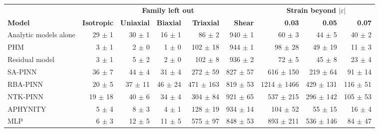 \begin{tabular}{lrrrrrrrr}
\toprule
 & \multicolumn{5}{c}{\textbf{Family left out}} & \multicolumn{3}{c}{\textbf{Strain beyond $|\varepsilon|$}} \\
\cmidrule(lr){2-6}\cmidrule(l){7-9}
\textbf{Model} & \textbf{Isotropic} & \textbf{Uniaxial} & \textbf{Biaxial} & \textbf{Triaxial} & \textbf{Shear} & \textbf{0.03} & \textbf{0.05} & \textbf{0.07} \\
\midrule
Analytic models alone & 29 $\pm$ 1 & 30 $\pm$ 1 & 16 $\pm$ 1 & 86 $\pm$ 2 & 940 $\pm$ 1 & 60 $\pm$ 3 & 44 $\pm$ 5 & 40 $\pm$ 2 \\
PHM & 3 $\pm$ 1 & 2 $\pm$ 0 & 1 $\pm$ 0 & 102 $\pm$ 18 & 944 $\pm$ 1 & 98 $\pm$ 28 & 49 $\pm$ 19 & 11 $\pm$ 3 \\
Residual model & 3 $\pm$ 1 & 5 $\pm$ 2 & 2 $\pm$ 0 & 102 $\pm$ 8 & 936 $\pm$ 2 & 72 $\pm$ 5 & 45 $\pm$ 8 & 23 $\pm$ 4 \\
SA-PINN & 36 $\pm$ 7 & 44 $\pm$ 4 & 31 $\pm$ 4 & 272 $\pm$ 59 & 827 $\pm$ 57 & 616 $\pm$ 150 & 219 $\pm$ 64 & 91 $\pm$ 14 \\
RBA-PINN & 20 $\pm$ 5 & 37 $\pm$ 11 & 46 $\pm$ 24 & 471 $\pm$ 163 & 819 $\pm$ 53 & 1214 $\pm$ 1466 & 429 $\pm$ 131 & 116 $\pm$ 51 \\
NTK-PINN & 19 $\pm$ 18 & 40 $\pm$ 6 & 34 $\pm$ 4 & 304 $\pm$ 84 & 921 $\pm$ 65 & 537 $\pm$ 215 & 296 $\pm$ 142 & 105 $\pm$ 53 \\
APHYNITY & 5 $\pm$ 4 & 8 $\pm$ 3 & 4 $\pm$ 1 & 128 $\pm$ 19 & 934 $\pm$ 14 & 104 $\pm$ 52 & 55 $\pm$ 15 & 16 $\pm$ 4 \\
MLP & 6 $\pm$ 3 & 12 $\pm$ 5 & 11 $\pm$ 5 & 575 $\pm$ 97 & 848 $\pm$ 53 & 893 $\pm$ 211 & 536 $\pm$ 146 & 84 $\pm$ 47 \\
\bottomrule
\end{tabular}
